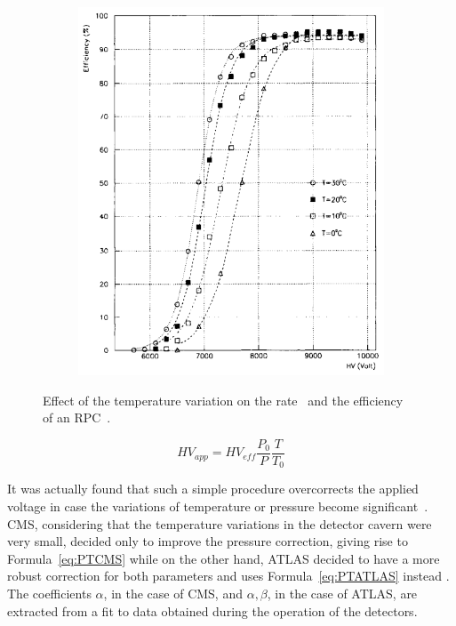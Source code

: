 \begin{figure}
\begin{subfigure}{\linewidth}
			\includegraphics[width = \linewidth]{fig/chapt3/Efficiency-temperature.png}
			\caption{\label{fig:TCorr:B}}
		\end{subfigure}
		\caption{\label{fig:TCorr} Effect of the temperature variation on the rate~ and the efficiency~ of an RPC~\cite{ABBRESCIA1995}.}
	\end{figure}
	
	\begin{equation}
	\label{eq:PTSimple}
	HV_{app} = HV_{eff}\frac{P_0}{P}\frac{T}{T_0}
	\end{equation}
	
	It was actually found that such a simple procedure overcorrects the applied voltage in case the variations of temperature or pressure become significant~\cite{ABBRESCIA2013,FILIP2014,BIANCO2007,BIANCO2009}. CMS, considering that the temperature variations in the detector cavern were very small, decided only to improve the pressure correction, giving rise to Formula~\ref{eq:PTCMS} \cite{ABBRESCIA2013} while on the other hand, ATLAS decided to have a more robust correction for both parameters and uses Formula~\ref{eq:PTATLAS} instead \cite{BIANCO2009}. The coefficients $\alpha$, in the case of CMS, and $\alpha,\beta$, in the case of ATLAS, are extracted from a fit to data obtained during the operation of the detectors.
	
